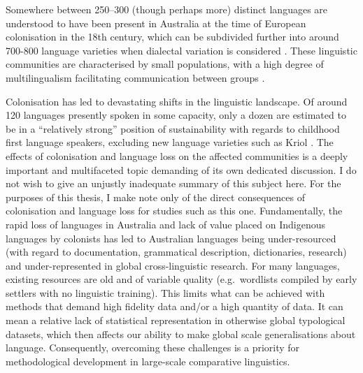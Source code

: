 Somewhere between 250--300 (though perhaps more) distinct languages are understood to have been present in Australia at the time of European colonisation in the 18th century, which can be subdivided further into around 700-800 language varieties when dialectal variation is considered \autocite{koch_languages_2014}. These linguistic communities are characterised by small populations, with a high degree of multilingualism facilitating communication between groups \autocite{koch_languages_2014}.

Colonisation has led to devastating shifts in the linguistic landscape. Of around 120 languages presently spoken in some capacity, only a dozen are estimated to be in a ``relatively strong'' position of sustainability with regards to childhood first language speakers, excluding new language varieties such as Kriol \autocite[p.~42]{australian_government_department_of_infrastructure_transport_regional_development_and_communications_national_2020}. The effects of colonisation and language loss on the affected communities is a deeply important and multifaceted topic demanding of its own dedicated discussion. I do not wish to give an unjustly inadequate summary of this subject here. For the purposes of this thesis, I make note only of the direct consequences of colonisation and language loss for studies such as this one. Fundamentally, the rapid loss of languages in Australia and lack of value placed on Indigenous languages by colonists has led to Australian languages being under-resourced (with regard to documentation, grammatical description, dictionaries, research) and under-represented in global cross-linguistic research. For many languages, existing resources are old and of variable quality (e.g.~wordlists compiled by early settlers with no linguistic training). This limits what can be achieved with methods that demand high fidelity data and/or a high quantity of data. It can mean a relative lack of statistical representation in otherwise global typological datasets, which then affects our ability to make global scale generalisations about language. Consequently, overcoming these challenges is a priority for methodological development in large-scale comparative linguistics.

